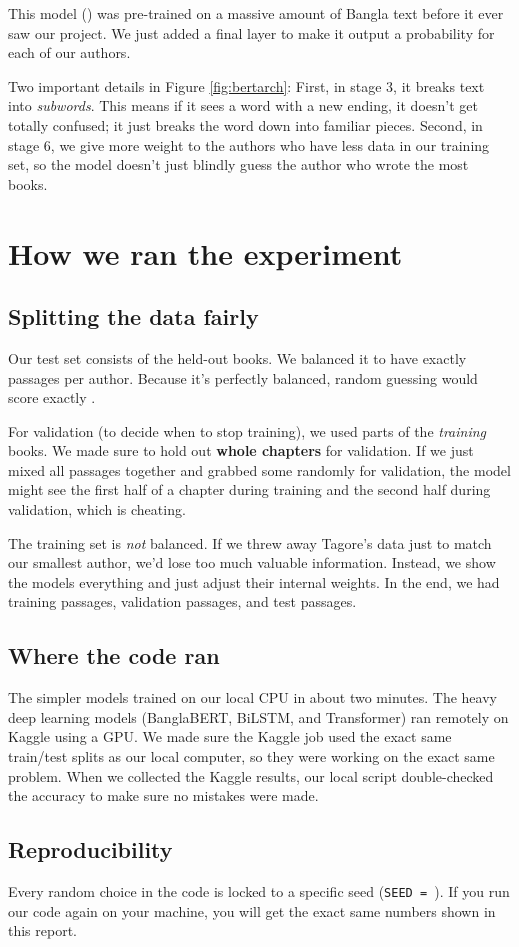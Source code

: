 This model (\PretrainedModel{}) was pre-trained on a massive amount of Bangla text before it ever saw our project. We just added a final layer to make it output a probability for each of our authors.

Two important details in Figure \ref{fig:bertarch}: First, in stage 3, it breaks text into \emph{subwords}. This means if it sees a word with a new ending, it doesn't get totally confused; it just breaks the word down into familiar pieces. Second, in stage 6, we give more weight to the authors who have less data in our training set, so the model doesn't just blindly guess the author who wrote the most books.

\section{How we ran the experiment}

\subsection{Splitting the data fairly}

Our test set consists of the \nUnseenBooks{} held-out books. We balanced it to have exactly \testPerAuthor{} passages per author. Because it's perfectly balanced, random guessing would score exactly \chanceAcc{}.

For validation (to decide when to stop training), we used parts of the \emph{training} books. We made sure to hold out \textbf{whole chapters} for validation. If we just mixed all passages together and grabbed some randomly for validation, the model might see the first half of a chapter during training and the second half during validation, which is cheating.

The training set is \emph{not} balanced. If we threw away Tagore's data just to match our smallest author, we'd lose too much valuable information. Instead, we show the models everything and just adjust their internal weights. In the end, we had \nTrain{} training passages, \nVal{} validation passages, and \nTest{} test passages.

\subsection{Where the code ran}

The simpler models trained on our local CPU in about two minutes. The heavy deep learning models (BanglaBERT, BiLSTM, and Transformer) ran remotely on Kaggle using a GPU. We made sure the Kaggle job used the exact same train/test splits as our local computer, so they were working on the exact same problem. When we collected the Kaggle results, our local script double-checked the accuracy to make sure no mistakes were made.

\subsection{Reproducibility}

Every random choice in the code is locked to a specific seed (\texttt{SEED = \Seed{}}). If you run our code again on your machine, you will get the exact same numbers shown in this report.
